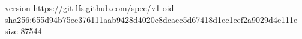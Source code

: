 version https://git-lfs.github.com/spec/v1
oid sha256:655d94b75ee376111aab9428d4020e8dcaec5d67418d1cc1eef2a9029d4e111e
size 87544
